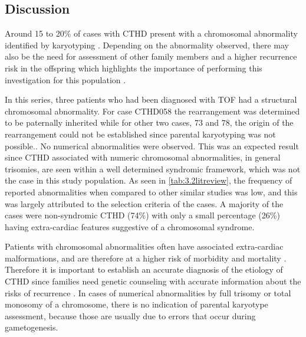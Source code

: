 \begin{refsection}
\section{Discussion} \label{18deldup}

Around 15 to 20\% of cases with CTHD present with a chromosomal abnormality identified by karyotyping \cite{robinson1994clinical, blue2012congenital}. Depending on the abnormality observed, there may also be the need for assessment of other family members and a higher recurrence risk in the offspring which highlights the importance of performing this investigation for this population \cite{hartman2011contribution, harris2003epidemiology, stoll1989risk, pradat1992epidemiology, hanna1994genetic, goodship1998population, grech1999syndromes, meberg2000outcome, roodpeyma2002risk, calzolari2003congenital, dadvand2009descriptive, hartman2011contribution, rosa2011trisomy}.

In this series, three patients who had been diagnosed with TOF had a structural chromosomal abnormality. For case CTHD058 the rearrangement was determined to be paternally inherited while for other two cases, 73 and 78, the origin of the rearrangement could not be established since parental karyotyping was not possible.. No numerical abnormalities were observed. This was an expected result since CTHD associated with numeric chromosomal abnormalities, in general trisomies, are seen within a well determined syndromic framework, which was not the case in this study population. As seen in \cref{tab:3.2litreview}, the frequency of reported abnormalities when compared to other similar studies was low, and this was largely attributed to the selection criteria of the cases. A majority of the cases were non-syndromic CTHD (74\%) with only a small percentage (26\%) having extra-cardiac features suggestive of a chromosomal syndrome. 

Patients with chromosomal abnormalities often have associated extra-cardiac malformations, and are therefore at a higher risk of morbidity and mortality \cite{hanna1994genetic, marino2000congenital, begic2003epidemiological, gonzalez2009universal}. Therefore it is important to establish an accurate diagnosis of the etiology of CTHD since families need genetic counseling with accurate information about the risks of recurrence \cite{prasad2002genetics}. In cases of numerical abnormalities by full trisomy or total monosomy of a chromosome, there is no indication of parental karyotype assessment, because those are usually due to errors that occur during gametogenesis.


\end{refsection}
